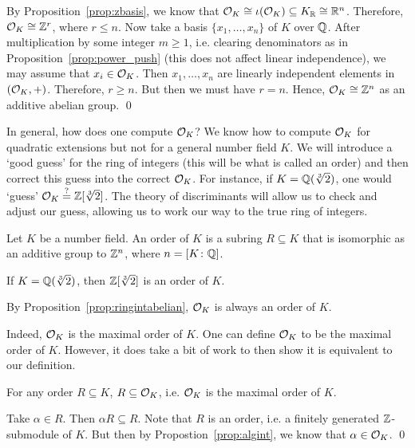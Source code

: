 \pf By Proposition~\ref{prop:zbasis}, we know that $\mathcal{O}_K \cong \iota(\mathcal{O}_K) \subseteq K_{\mathbb{R}} \cong \mathbb{R}^n$. Therefore, $\mathcal{O}_K \cong \mathbb{Z}^r$, where $r \leq n$. Now take a basis $\{ x_1, \ldots, x_n \}$ of $K$ over $\mathbb{Q}$. After multiplication by some integer $m \geq 1$, i.e. clearing denominators as in Proposition~\ref{prop:power_push} (this does not affect linear independence), we may assume that $x_i \in \mathcal{O}_K$. Then $x_1, \ldots, x_n$ are linearly independent elements in $(\mathcal{O}_K, +)$. Therefore, $r \geq n$. But then we must have $r= n$. Hence, $\mathcal{O}_K \cong \mathbb{Z}^n$ as an additive abelian group. \qed \pskip


In general, how does one compute $\mathcal{O}_K$? We know how to compute $\mathcal{O}_K$ for quadratic extensions but not for a general number field $K$. We will introduce a `good guess' for the ring of integers (this will be what is called an order) and then correct this guess into the correct $\mathcal{O}_K$. For instance, if $K= \mathbb{Q}(\sqrt[3]{2})$, one would `guess' $\mathcal{O}_K \stackrel{?}{=} \mathbb{Z}[\sqrt[3]{2}]$. The theory of discriminants will allow us to check and adjust our guess, allowing us to work our way to the true ring of integers. 


\begin{dfn}[Order]
Let $K$ be a number field. An order of $K$ is a subring $R \subseteq K$ that is isomorphic as an additive group to $\mathbb{Z}^n$, where $n= [K \colon \mathbb{Q}]$. 
\end{dfn}


\begin{ex}
If $K= \mathbb{Q}(\sqrt[3]{2})$, then $\mathbb{Z}[\sqrt[3]{2}]$ is an order of $K$. \xqed \pskip
\end{ex}


\begin{ex}
By Proposition~\ref{prop:ringintabelian}, $\mathcal{O}_K$ is always an order of $K$. \xqed \pskip
\end{ex}


Indeed, $\mathcal{O}_K$ is the maximal order of $K$. One can define $\mathcal{O}_K$ to be the maximal order of $K$. However, it does take a bit of work to then show it is equivalent to our definition. 


\begin{lem} \label{lem:max_order}
For any order $R \subseteq K$, $R \subseteq \mathcal{O}_K$, i.e. $\mathcal{O}_K$ is the maximal order of $K$.
\end{lem}

\pf Take $\alpha \in R$. Then $\alpha R \subseteq R$. Note that $R$ is an order, i.e. a finitely generated $\mathbb{Z}$-submodule of $K$. But then by Propostion~\ref{prop:algint}, we know that $\alpha \in \mathcal{O}_K$. \qed \pskip



